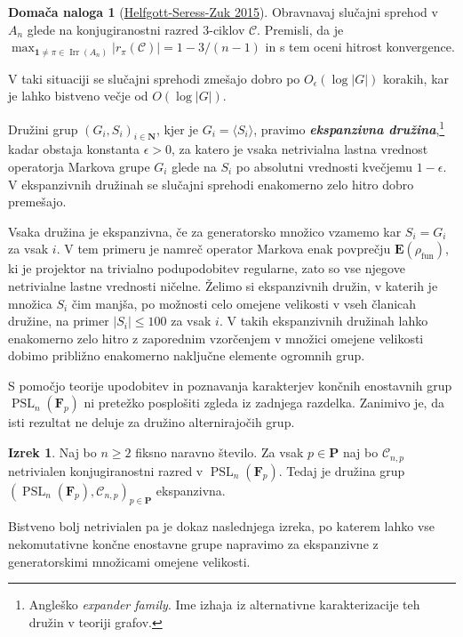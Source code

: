 \documentclass[11pt]{book}
\def\NN{\mathbf{N}}
\def\conclass{\mathcal{C}}
\def\11{\mathbf{1}}
\def\FF{\mathbf{F}}
\def\EE{\mathbf{E}}
\def\PP{\mathbf{P}}
\DeclareMathOperator\Irr{Irr}
\DeclareMathOperator\fun{fun}
\DeclareMathOperator\PSL{PSL}
\def\definicija{\color{rdeca}\bf\em}
\theoremstyle{definition}
\theoremstyle{zgled}
\theoremstyle{odprtproblem}
\theoremstyle{domacanaloga}
\newtheorem*{domacanaloga}{Domača naloga}
\theoremstyle{izrek}
\newtheorem*{izrek}{Izrek}
\begin{document}
\begin{domacanaloga}[\href{https://www.sciencedirect.com/science/article/pii/S0021869314004797}{Helfgott-Seress-Zuk 2015}]
    Obravnavaj slučajni sprehod v $A_n$ glede na konjugiranostni razred $3$-ciklov $\conclass$. Premisli, da je $\max_{\11 \neq \pi \in \Irr(A_n)} |r_{\pi}(\conclass)| = 1 - 3/(n-1)$ in s tem oceni hitrost konvergence.
    \end{domacanaloga}

V taki situaciji se slučajni sprehodi zmešajo dobro po $O_{\epsilon}(\log |G|)$ korakih, kar je lahko bistveno večje od $O(\log |G|)$.

Družini grup $(G_i, S_i)_{i \in \NN}$, kjer je $G_i = \langle S_i \rangle$, pravimo {\definicija ekspanzivna družina},\footnote{Angleško \emph{expander family}. Ime izhaja iz alternativne karakterizacije teh družin v teoriji grafov.} kadar obstaja konstanta $\epsilon > 0$, za katero je vsaka netrivialna lastna vrednost operatorja Markova grupe $G_i$ glede na $S_i$ po absolutni vrednosti kvečjemu $1 - \epsilon$. V ekspanzivnih družinah se slučajni sprehodi enakomerno zelo hitro dobro premešajo.

Vsaka družina je ekspanzivna, če za generatorsko množico vzamemo kar $S_i = G_i$ za vsak $i$. V tem primeru je namreč operator Markova enak povprečju $\EE(\rho_{\fun})$, ki je projektor na trivialno podupodobitev regularne, zato so vse njegove netrivialne lastne vrednosti ničelne. Želimo si ekspanzivnih družin, v katerih je množica $S_i$ čim manjša, po možnosti celo omejene velikosti v vseh članicah družine, na primer $|S_i| \leq 100$ za vsak $i$. V takih ekspanzivnih družinah lahko enakomerno zelo hitro z zaporednim vzorčenjem v množici omejene velikosti dobimo približno enakomerno naključne elemente ogromnih grup.

S pomočjo teorije upodobitev in poznavanja karakterjev končnih enostavnih grup $\PSL_n(\FF_p)$ ni pretežko posplošiti zgleda iz zadnjega razdelka. Zanimivo je, da isti rezultat ne deluje za družino alternirajočih grup.

\begin{izrek}
Naj bo $n \geq 2$ fiksno naravno število. Za vsak $p \in \PP$ naj bo $\conclass_{n,p}$ netrivialen konjugiranostni razred v $\PSL_n(\FF_p)$. Tedaj je družina grup $( \PSL_n(\FF_p), \conclass_{n,p} )_{p \in \PP}$ ekspanzivna.
\end{izrek}

Bistveno bolj netrivialen pa je dokaz naslednjega izreka, po katerem lahko vse nekomutativne končne enostavne grupe napravimo za ekspanzivne z generatorskimi množicami omejene velikosti.
\end{document}
